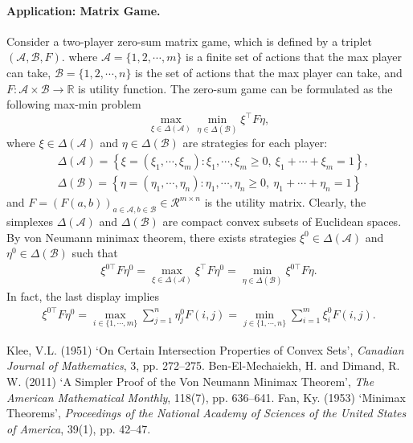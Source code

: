 \documentclass{article}
\numberwithin{equation}{section}
\newcommand{\bbR}{\mathbb{R}}
\renewcommand{\cal}{\mathcal}
\begin{document}
\paragraph{Application: Matrix Game.} Consider a two-player zero-sum matrix game, which is defined by a triplet $(\mathcal{A}, \mathcal{B}, F)$.
where $\mathcal{A} = \{1,2,\cdots,m\}$ is a finite set of actions that the max player can take, $\mathcal{B} = \{1,2,\cdots,n\}$ is the set of actions that the max player can take, and $F:\cal{A}\times\cal{B}\to\bbR$ is utility function. The zero-sum game can be formulated as the following max-min problem
$$\max_{\xi\in\Delta(\mathcal{A})}\min_{\eta\in\Delta(\mathcal{B})}\xi^\top F\eta,$$
where $\xi\in\Delta(\mathcal{A})$ and $\eta\in\Delta(\mathcal{B})$ are strategies for each player:
\begin{align*}
	&\Delta(\cal{A})=\left\{\xi=(\xi_1,\cdots,\xi_m):\xi_1,\cdots,\xi_m\geq 0,\ \xi_1+\cdots+\xi_m=1\right\},\\
	&\Delta(\cal{B})=\left\{\eta=(\eta_1,\cdots,\eta_n):\eta_1,\cdots,\eta_n\geq 0,\ \eta_1+\cdots+\eta_n=1\right\}
\end{align*}
and $F = (F(a,b))_{a\in\mathcal{A},b\in\mathcal{B}}\in\mathcal{R}^{m\times n}$ is the utility matrix. Clearly, the simplexes $\Delta(\cal{A})$ and $\Delta(\cal{B})$ are compact convex subsets of Euclidean spaces. By von Neumann minimax theorem, there exists strategies $\xi^0\in\Delta(\cal{A})$ and $\eta^0\in\Delta(\cal{B})$ such that
\begin{align*}
	\xi^{0\top} F\eta^0 = \max_{\xi\in\Delta(\cal{A})}\xi^\top F\eta^0=\min_{\eta\in\Delta(\cal{B})}\xi^{0\top} F\eta.
\end{align*}
In fact, the last display implies
\begin{align*}
	\xi^{0\top} F\eta^0 = \max_{i\in\{1,\cdots,m\}}\sum_{j=1}^n \eta^0_jF(i,j)=\min_{j\in\{1,\cdots,n\}}\sum_{i=1}^m\xi^0_i F(i,j).
\end{align*}
\begin{thebibliography}{100}
 Klee, V.L. (1951) ‘On Certain Intersection Properties of Convex Sets’, \textit{Canadian Journal of Mathematics}, 3, pp. 272–275. 
 Ben-El-Mechaiekh, H. and Dimand, R. W. (2011) ‘A Simpler Proof of the Von Neumann Minimax Theorem’, \textit{The American Mathematical Monthly}, 118(7), pp. 636–641. 
 Fan, Ky. (1953) `Minimax Theorems', \textit{Proceedings of the National Academy of Sciences of the United States of America}, 39(1), pp. 42–47.
\end{thebibliography}
\end{document}
